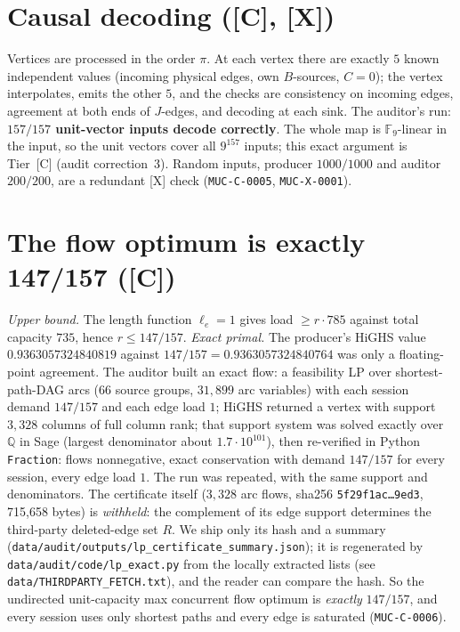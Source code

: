 \documentclass[10pt]{article}
\newcommand{\tier}[1]{\textsf{[#1]}}
\newcommand{\tC}{\tier{C}}
\newcommand{\tX}{\tier{X}}
\newcommand{\F}{\mathbb F}
\begin{document}
\section{Causal decoding (\tC{}, \tX{})}\label{sec:decode}
Vertices are processed in the order $\pi$. At each vertex there are exactly $5$ known independent values (incoming physical edges, own $B$-sources, $C=0$); the vertex interpolates, emits the other $5$, and the checks are consistency on incoming edges, agreement at both ends of $J$-edges, and decoding at each sink. The auditor's run: \textbf{$157/157$ unit-vector inputs decode correctly}. The whole map is $\F_9$-linear in the input, so the unit vectors cover all $9^{157}$ inputs; this exact argument is Tier~\tC{} (audit correction~3). Random inputs, producer $1000/1000$ and auditor $200/200$, are a redundant \tX{} check (\texttt{MUC-C-0005}, \texttt{MUC-X-0001}).

\section{The flow optimum is exactly 147/157 (\tC{})}\label{sec:lp}
\emph{Upper bound.} The length function $\ell_e=1$ gives load $\ge r\cdot785$ against total capacity $735$, hence $r\le147/157$. \emph{Exact primal.} The producer's HiGHS value $0.9363057324840819$ against $147/157=0.9363057324840764$ was only a floating-point agreement. The auditor built an exact flow: a feasibility LP over shortest-path-DAG arcs (66 source groups, $31{,}899$ arc variables) with each session demand $147/157$ and each edge load $1$; HiGHS returned a vertex with support $3{,}328$ columns of full column rank; that support system was solved exactly over $\mathbb Q$ in Sage (largest denominator about $1.7\cdot10^{101}$), then re-verified in Python \texttt{Fraction}: flows nonnegative, exact conservation with demand $147/157$ for every session, every edge load $1$. The run was repeated, with the same support and denominators. The certificate itself ($3{,}328$ arc flows, sha256 \texttt{5f29f1ac\dots9ed3}, 715{,}658 bytes) is \emph{withheld}: the complement of its edge support determines the third-party deleted-edge set $R$. We ship only its hash and a summary (\texttt{data/audit/outputs/lp\_certificate\_summary.json}); it is regenerated by \texttt{data/audit/code/lp\_exact.py} from the locally extracted lists (see \texttt{data/THIRDPARTY\_FETCH.txt}), and the reader can compare the hash. So the undirected unit-capacity max concurrent flow optimum is \emph{exactly} $147/157$, and every session uses only shortest paths and every edge is saturated (\texttt{MUC-C-0006}).
\end{document}
